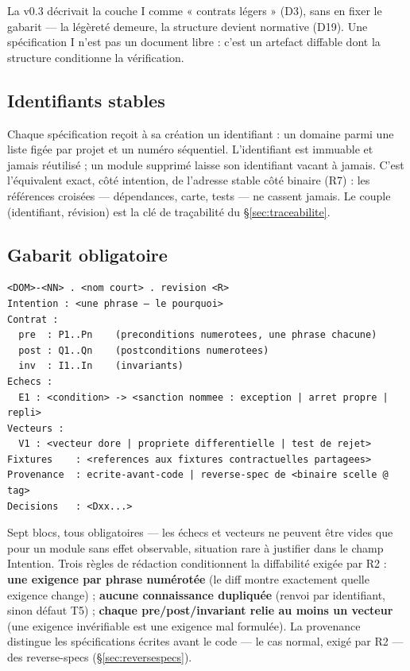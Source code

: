 La v0.3 décrivait la couche I comme « contrats légers » (D3), sans en fixer le gabarit —
la légèreté demeure, la structure devient normative (D19). Une spécification I n’est pas un
document libre : c’est un artefact diffable dont la structure conditionne la vérification.

\subsection{Identifiants stables}

Chaque spécification reçoit à sa création un identifiant  : un domaine
parmi une liste figée par projet et un numéro séquentiel. L’identifiant est immuable et
jamais réutilisé ; un module supprimé laisse son identifiant vacant à jamais. C’est
l’équivalent exact, côté intention, de l’adresse stable côté binaire (R7) : les références
croisées — dépendances, carte, tests — ne cassent jamais. Le couple (identifiant,
révision) est la clé de traçabilité du §\ref{sec:traceabilite}.

\subsection{Gabarit obligatoire}

\begin{lstlisting}
<DOM>-<NN> . <nom court> . revision <R>
Intention : <une phrase — le pourquoi>
Contrat :
  pre  : P1..Pn    (preconditions numerotees, une phrase chacune)
  post : Q1..Qn    (postconditions numerotees)
  inv  : I1..In    (invariants)
Echecs :
  E1 : <condition> -> <sanction nommee : exception | arret propre | repli>
Vecteurs :
  V1 : <vecteur dore | propriete differentielle | test de rejet>
Fixtures    : <references aux fixtures contractuelles partagees>
Provenance  : ecrite-avant-code | reverse-spec de <binaire scelle @ tag>
Decisions   : <Dxx...>
\end{lstlisting}

Sept blocs, tous obligatoires — les échecs et vecteurs ne peuvent être vides que pour un
module sans effet observable, situation rare à justifier dans le champ Intention. Trois
règles de rédaction conditionnent la diffabilité exigée par R2 : \textbf{une exigence par
phrase numérotée} (le diff montre exactement quelle exigence change) ; \textbf{aucune
connaissance dupliquée} (renvoi par identifiant, sinon défaut T5) ; \textbf{chaque
pre/post/invariant relie au moins un vecteur} (une exigence invérifiable est une exigence
mal formulée). La provenance distingue les spécifications écrites avant le code — le cas
normal, exigé par R2 — des reverse-specs (§\ref{sec:reversespecs}).

